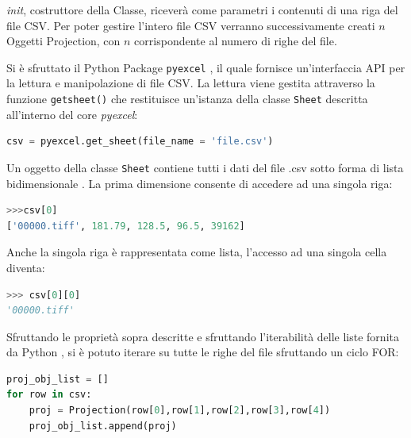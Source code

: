 \documentclass[a4paper,12pt, doubleside]{report}
\begin{document}
               \textit{\textunderscore \textunderscore init\textunderscore \textunderscore}, costruttore della Classe, riceverà come parametri i contenuti di una riga del file CSV. Per poter gestire l'intero file CSV verranno successivamente creati $n$ Oggetti Projection, con $n$ corrispondente al numero di righe del file.
            
            \bigskip
            \par
                Si è sfruttato il Python Package \texttt{pyexcel} \cite{pyexcel}, il quale fornisce un'interfaccia API per la lettura e manipolazione di file CSV. La lettura viene gestita attraverso la funzione \texttt{get\textunderscore sheet()} che restituisce un'istanza della classe \texttt{Sheet} descritta all'interno del core \textit{pyexcel}:
                
                \begin{lstlisting}[language=python, frame=bt]
csv = pyexcel.get_sheet(file_name = 'file.csv')
                \end{lstlisting}
            
            \bigskip
            \par
                Un oggetto della classe \texttt{Sheet} contiene tutti i dati del file .csv sotto forma di lista bidimensionale \cite{pyexcel-docs}. La prima dimensione consente di accedere ad una singola riga:
                
                \begin{lstlisting}[language=python, frame=bt]
>>>csv[0]
['00000.tiff', 181.79, 128.5, 96.5, 39162]
                \end{lstlisting}
            
                Anche la singola riga è rappresentata come lista, l'accesso ad una singola cella diventa:
                \begin{lstlisting}[language=python, frame=bt]
>>> csv[0][0]
'00000.tiff'
                \end{lstlisting}
            
            \bigskip
            \par
                Sfruttando le proprietà sopra descritte e sfruttando l'iterabilità delle liste fornita da Python \cite{python-list}, si è potuto iterare su tutte le righe del file sfruttando un ciclo FOR:
            
                \begin{lstlisting}[language=python, frame=bt]
proj_obj_list = []
for row in csv:
    proj = Projection(row[0],row[1],row[2],row[3],row[4])
    proj_obj_list.append(proj)
                \end{lstlisting}
            
\end{document}
